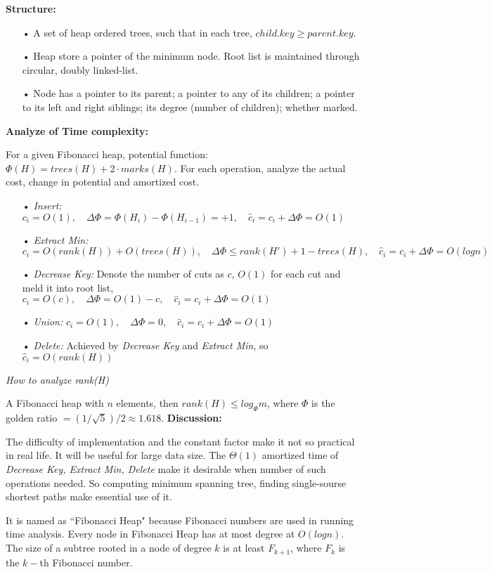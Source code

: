 \documentclass[catalog.tex]{subfiles}
\begin{document}
\textbf{Structure:} 
\begin{enumerate}
\item[•] A set of heap ordered trees, such that in each tree, $child.key \geq parent.key$. 
\item[•] Heap store a pointer of the minimum node. Root list is maintained through circular, doubly linked-list.\item[•] Node has a pointer to its parent; a pointer to any of its children; a pointer to its left and right siblings; its degree (number of children); whether marked.
\end{enumerate}
\textbf{Analyze of Time complexity:} 

For a given Fibonacci heap, potential function: $\Phi(H)=trees(H)+2\cdot marks(H)$. For each operation, analyze the actual cost, change in potential and amortized cost. 
\begin{enumerate}
\item[•] \textit{Insert:} $c_i=O(1),\quad \Delta \Phi = \Phi (H_i) - \Phi (H_{i-1})=+1,\quad \hat{c}_i = c_i + \Delta \Phi = O(1)$
\item[•] \textit{Extract Min:} $c_i=O(rank(H)) + O(trees(H)),\quad \Delta \Phi \leq  rank(H') + 1 - trees(H),\quad \hat{c}_i = c_i + \Delta \Phi = O(logn)$
\item[•] \textit{Decrease Key:} Denote the number of cuts as $c$, $O(1)$ for each cut and meld it into root list, $c_i=O(c),\quad \Delta \Phi =  O(1) - c,\quad \hat{c}_i = c_i + \Delta \Phi = O(1)$
\item[•] \textit{Union:} $c_i=O(1),\quad \Delta \Phi =  0,\quad \hat{c}_i = c_i + \Delta \Phi = O(1)$
\item[•] \textit{Delete:} Achieved by \textit{Decrease Key} and \textit{Extract Min}, so $\hat{c}_i = O(rank(H))$
\end{enumerate}
\textit{How to analyze rank(H)}

A Fibonacci heap with $n$ elements, then $rank(H)\leq log_{\Phi }m$, where $\Phi$ is the golden ratio $=(1/ \sqrt{5})/2 \approx 1.618$.
\textbf{Discussion:}

The difficulty of implementation and the constant  factor make it not so practical in real life. It will be useful for large data size. The $\Theta (1)$ amortized time of \textit{Decrease Key, Extract Min, Delete} make it desirable when number of such operations needed. So computing minimum spanning tree, finding single-sourse shortest paths make essential use of it. 

It is named as ``Fibonacci Heap" because Fibonacci numbers are used in running time analysis. Every node in Fibonacci Heap has at most degree at $O(logn)$. The size of a subtree rooted in a node of degree $k$ is at least $F_{k+1}$, where $F_k$ is the $k-$th Fibonacci number. 
\end{document}

